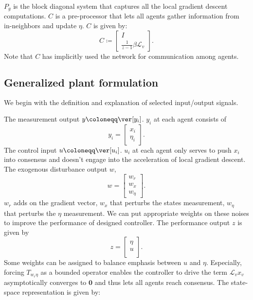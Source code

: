 \(P_g\) is the block diagonal system that captures all the local gradient descent computations. \(C\) is a pre-processor that lets all agents gather information from in-neighbors and update \(\eta\). \(C\) is given by:
\[
C \coloneqq \begin{bmatrix}
    I \\
    \frac{1}{z - 1}\beta \mathcal{L}_v
\end{bmatrix}.
\]
Note that \(C\) has implicitly used the network for communication among agents.
\subsection{Generalized plant formulation}
We begin with the definition and explanation of selected input/output signals.

The measurement output \(y \coloneqq \ver[y_i]\). \(y_i\) at each agent consists of
\[
y_i = \begin{bmatrix}
    x_i \\
    \eta_i
\end{bmatrix}.
\]
The control input \(u \coloneqq \ver[u_i]\). \(u_i\) at each agent only serves to push \(x_i\) into consensus and doesn't engage into the acceleration of local gradient descent.
The exogenous disturbance output \(w\),
\[
w = \begin{bmatrix}
    w_r \\
    w_x \\
    w_\eta
\end{bmatrix}.
\]
\(w_r\) adds on the gradient vector, \(w_x\) that perturbs the states measurement, \(w_\eta\) that perturbs the \(\eta\) measurement. We can put appropriate weights on these noises to improve the performance of designed controller. The performance output \(z\) is given by
\[
z = \begin{bmatrix}
    \eta \\
    u \\
\end{bmatrix}.
\]
Some weights can be assigned to balance emphasis between \(u\) and \(\eta\). Especially, forcing \(T_{w_r \eta}\) as a bounded operator enables the controller to drive the term \(\mathcal{L}_v x_v\) asymptotically converges to \(\mathbf{0}\) and thus lets all agents reach consensus.
The state-space representation is given by:
